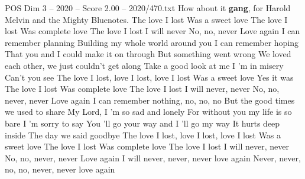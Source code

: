 \begin{textsample}{POS Dim 3 – 2020 – Score 2.00 – 2020/470.txt}  \label{ex:f3_pos_003}
How about it \textbf{gang}, for Harold Melvin and the Mighty Bluenotes.
The love I lost Was a sweet love The love I lost Was complete love The love I lost I will never No, no, never Love again I can remember planning Building my whole world around you I can remember hoping That you and I could make it on through But something went wrong We loved each other, we just couldn't get along Take a good look at me I 'm in misery Can't you see The love I lost, love I lost, love I lost Was a sweet love Yes it was The love I lost Was complete love The love I lost I will never, never No, no, never, never Love again I can remember nothing, no, no, no But the good times we used to share My Lord, I 'm so sad and lonely For without you my life is so bare I 'm sorry to say You 'll go your way and I 'll go my way It hurts deep inside The day we said goodbye The love I lost, love I lost, love I lost Was a sweet love The love I lost Was complete love The love I lost I will never, never No, no, never, never Love again I will never, never, never love again Never, never, no, no, never, never love again

\end{textsample}
